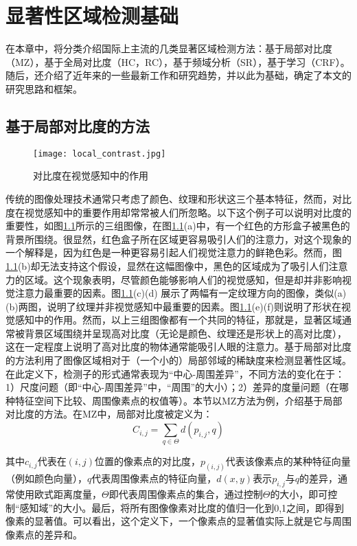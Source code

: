 
\chapter{显著性区域检测基础}
在本章中，将分类介绍国际上主流的几类显著区域检测方法：基于局部对比度（MZ\cite{ma2003contrast}），基于全局对比度（HC，RC\cite{cheng2011global}），基于频域分析（SR\cite{hou2007saliency}），基于学习（CRF\cite{maisaliency}）。随后，还介绍了近年来的一些最新工作和研究趋势，并以此为基础，确定了本文的研究思路和框架。

\section{基于局部对比度的方法}
\begin{figure}[h]
\centering
\texttt{[image: local\_contrast.jpg]}
\caption{对比度在视觉感知中的作用}\label{fig:local_contrast}
\end{figure}

传统的图像处理技术通常只考虑了颜色、纹理和形状这三个基本特征，然而，对比度在视觉感知中的重要作用却常常被人们所忽略。以下这个例子可以说明对比度的重要性\citep{ma2003contrast}，如图\ref{fig:local_contrast}所示的三组图像，在图\ref{fig:local_contrast}(a)中，有一个红色的方形盒子被黑色的背景所围绕。很显然，红色盒子所在区域更容易吸引人们的注意力，对这个现象的一个解释是，因为红色是一种更容易引起人们视觉注意力的鲜艳色彩。然而，图\ref{fig:local_contrast}(b)却无法支持这个假设，显然在这幅图像中，黑色的区域成为了吸引人们注意力的区域。这个现象表明，尽管颜色能够影响人们的视觉感知，但是却并非影响视觉注意力最重要的因素。图\ref{fig:local_contrast}(c)(d) 展示了两幅有一定纹理方向的图像，类似(a)(b)两图，说明了纹理并非视觉感知中最重要的因素。图\ref{fig:local_contrast}(e)(f)则说明了形状在视觉感知中的作用。然而，以上三组图像都有一个共同的特征，那就是，显著区域通常被背景区域围绕并呈现高对比度（无论是颜色、纹理还是形状上的高对比度），这在一定程度上说明了高对比度的物体通常能吸引人眼的注意力。基于局部对比度的方法利用了图像区域相对于（一个小的）局部邻域的稀缺度来检测显著性区域。在此定义下，检测子的形式通常表现为“中心-周围差异”，不同方法的变化在于：1）尺度问题（即“中心-周围差异”中，“周围”的大小）；2）差异的度量问题（在哪种特征空间下比较、周围像素点的权值等）。本节以MZ\cite{ma2003contrast}方法为例，介绍基于局部对比度的方法。在MZ中，局部对比度被定义为：
\begin{equation}
C_{i,j} = \sum_{q \in \Theta}d(p_{i,j},q) \label{eq:local}
\end{equation}

其中$c_{i,j}$代表在$(i,j)$位置的像素点的对比度，$p_(i,j)$代表该像素点的某种特征向量（例如颜色向量），$q$代表周围像素点的特征向量，$d(x,y)$表示$p_{i,j}$与$q$的差异，通常使用欧式距离度量，$\Theta$即代表周围像素点的集合，通过控制$\Theta$的大小，即可控制“感知域”的大小。最后，将所有图像像素对比度的值归一化到0,1之间，即得到像素的显著值。可以看出，这个定义下，一个像素点的显著值实际上就是它与周围像素点的差异和。

